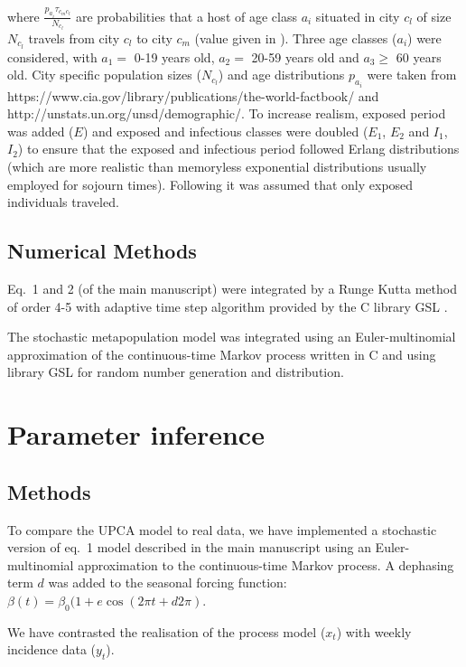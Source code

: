 where $\frac{p_{a_i} \tau_{c_mc_l}}{N_{c_l}}$ are probabilities that a
host of age class $a_i$ situated in city $c_l$ of size $N_{c_l}$
travels from city $c_l$ to city $c_m$ (value given in
\citep{Grais2003}).  Three age classes ($a_i$) were considered, with $a_1 =$
0-19 years old, $a_2 =$ 20-59 years old and $a_3 \geq$ 60 years
old. City specific population sizes ($N_{c_l}$) and age distributions $p_{a_i}$ were
taken from
https://www.cia.gov/library/publications/the-world-factbook/ and
http://unstats.un.org/unsd/demographic/. To increase realism, exposed
period was added ($E$) and exposed and infectious classes were doubled
($E_1$, $E_2$ and $I_1$, $I_2$) to ensure that the exposed and
infectious period followed Erlang distributions (which are more realistic than memoryless exponential distributions usually employed for sojourn times).  Following
\citet{Cooper2006a} it was assumed that only exposed individuals
traveled.

\subsection{Numerical Methods}

Eq.~1 and 2 (of the main manuscript) were integrated by a Runge Kutta method of order 4-5 with adaptive
time step algorithm provided by the C library GSL \citep{Galassi2003}.

The stochastic metapopulation model was integrated using an
Euler-multinomial approximation of the continuous-time Markov process
\citep{Breto2009} written in C and using library GSL
\citep{Galassi2003} for random number generation and distribution.

\clearpage

\section{Parameter inference}

\subsection{Methods}

To compare the UPCA model to real data, we have implemented a
stochastic version of eq.~1 model described in the main manuscript using an Euler-multinomial approximation to the
continuous-time Markov process. A dephasing term $d$ was added to the
seasonal forcing function: $\beta(t)=\beta_0(1+e \cos(2 \pi t +d
2\pi)$. 

We have contrasted the realisation of the process model ($x_t$) with
weekly incidence data ($y_t$).

